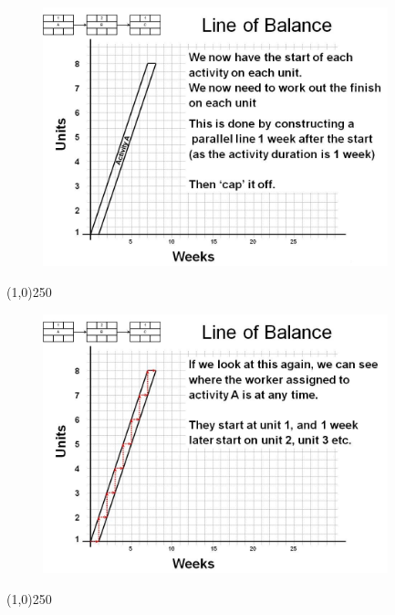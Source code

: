 \begin{frame}
\begin{figure}
	\centering
		\includegraphics[width = 10.0cm]{oldnotes/Slide245.jpg}
\end{figure}
\end{frame}
\begin{center}\line(1,0){250}\end{center}






\begin{frame}
\begin{figure}
	\centering
		\includegraphics[width = 10.0cm]{oldnotes/Slide246.jpg}
\end{figure}
\end{frame}
\begin{center}\line(1,0){250}\end{center}






